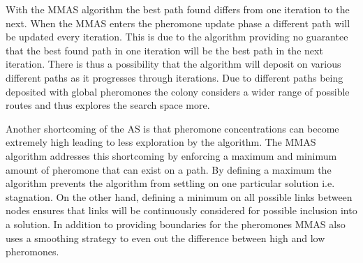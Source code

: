 With the \gls{MMAS} algorithm the best path found differs from one iteration to the next\cite{FundamentalSwarm}. When the \gls{MMAS} enters the pheromone update phase a different path will be updated every iteration\cite{FundamentalSwarm}. This is due to the algorithm providing no guarantee that the best found path in one iteration will be the best path in the next iteration\cite{FundamentalSwarm}. There is thus a possibility that the algorithm will deposit on various different paths as it progresses through iterations\cite{FundamentalSwarm}. Due to different paths being deposited with global pheromones the colony considers a wider range of possible routes and thus explores the search space more\cite{FundamentalSwarm}.

Another shortcoming of the \gls{AS} is that pheromone concentrations can become extremely high leading to less exploration by the algorithm\cite{FundamentalSwarm}. The \gls{MMAS} algorithm addresses this shortcoming by enforcing a maximum and minimum amount of pheromone that can exist on a path\cite{FundamentalSwarm}. By defining a maximum the algorithm prevents the algorithm from settling on one particular solution i.e. stagnation\cite{FundamentalSwarm}. On the other hand, defining a minimum on all possible links between nodes ensures that links will be continuously considered for possible inclusion into a solution\cite{FundamentalSwarm}. In addition to providing boundaries for the pheromones \gls{MMAS} also uses a smoothing strategy to even out the difference between high and low pheromones\cite{FundamentalSwarm}.

